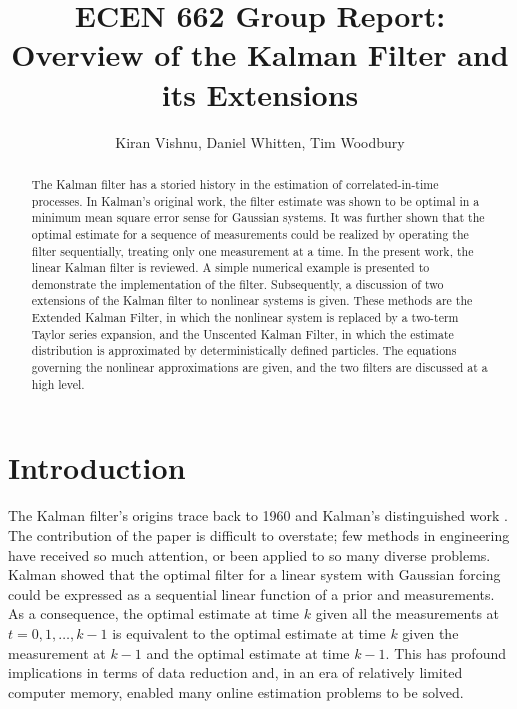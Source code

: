 \documentclass[12pt,draftcls,onecolumn]{IEEEtran}
\author{Kiran Vishnu, Daniel Whitten, Tim Woodbury}
\title{ECEN 662 Group Report: Overview of the Kalman Filter and its Extensions}
\begin{document}
\maketitle

\begin{abstract}
The Kalman filter has a storied history in the estimation of correlated-in-time processes.
In Kalman's original work, the filter estimate was shown to be optimal in a minimum mean square error sense for Gaussian systems. It was further shown that the optimal estimate for a sequence of measurements could be realized by operating the filter sequentially, treating only one measurement at a time.
In the present work, the linear Kalman filter is reviewed.
A simple numerical example is presented to demonstrate the implementation of the filter.
Subsequently, a discussion of two extensions of the Kalman filter to nonlinear systems is given.
These methods are the Extended Kalman Filter, in which the nonlinear system is replaced by a two-term Taylor series expansion, and the Unscented Kalman Filter, in which the estimate distribution is approximated by deterministically defined particles.
The equations governing the nonlinear approximations are given, and the two filters are discussed at a high level.
\end{abstract}

\section{Introduction}

The Kalman filter's origins trace back to 1960 and Kalman's distinguished work \cite{kalman1960}.
The contribution of the paper is difficult to overstate; few methods in engineering have received so much attention, or been applied to so many diverse problems.
Kalman showed that the optimal filter for a linear system with Gaussian forcing could be expressed as a sequential linear function of a prior and measurements.
As a consequence, the optimal estimate at time $k$ given all the measurements at $t = 0, 1, \dots, k-1$ is equivalent to the optimal estimate at time $k$ given the measurement at $k-1$ and the optimal estimate at time $k-1$.
This has profound implications in terms of data reduction and, in an era of relatively limited computer memory, enabled many online estimation problems to be solved.
\end{document}
